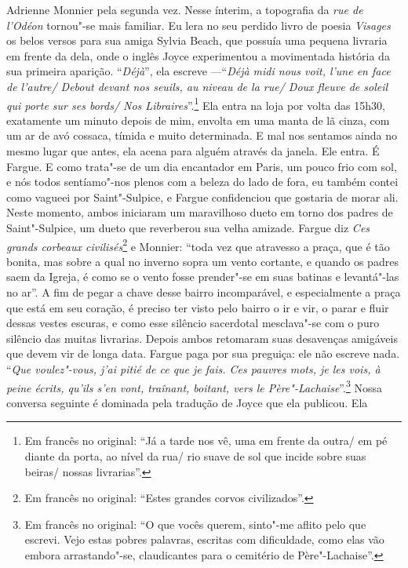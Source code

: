 Adrienne Monnier pela segunda vez. Nesse ínterim,
a topografia da \emph{rue de l'Odéon} tornou"-se mais familiar. Eu lera
no seu perdido livro de poesia \emph{Visages} os belos versos para sua
amiga Sylvia Beach, que possuía uma pequena livraria em frente da dela,
onde o inglês Joyce experimentou a movimentada história da sua primeira
aparição. ``\emph{Déjà}'', ela escreve ---``\emph{Déjà midi nous voit,
l'une en face de l'autre/ Debout devant nos seuils, au niveau de la rue/ Doux fleuve de soleil qui porte sur ses bords/ Nos
Libraires}''.\footnote{Em francês no original: ``Já a tarde nos vê, uma em frente da outra/
  em pé diante da porta, ao nível da rua/ rio suave de sol que incide
  sobre suas beiras/ nossas livrarias''. \versal{[N.~T.]}} Ela
entra na loja por volta das 15h30, exatamente um minuto depois de mim,
envolta em uma manta de lã cinza, com um ar de avó cossaca, tímida e
muito determinada. E mal nos sentamos ainda no mesmo lugar que antes,
ela acena para alguém através da janela. Ele entra. É Fargue. E como
trata"-se de um dia encantador em Paris, um pouco frio com sol, e nós
todos sentíamo"-nos plenos com a beleza do lado de fora, eu também
contei como vagueei por Saint"-Sulpice, e Fargue confidenciou que
gostaria de morar ali. Neste momento, ambos iniciaram um maravilhoso
dueto em torno dos padres de Saint"-Sulpice, um dueto que reverberou sua
velha amizade. Fargue diz \emph{Ces grands corbeaux civilisés}\footnote{Em francês no original:
  ``Estes grandes corvos civilizados''. \versal{[N.~T.]}} e
Monnier: ``toda vez que atravesso a praça, que é tão bonita, mas sobre a qual no inverno sopra um vento cortante, e quando os padres saem da Igreja, é como se o vento fosse prender"-se em suas batinas e levantá"-las no ar''.
A fim de pegar a chave desse bairro incomparável, e especialmente a praça que está em seu coração, é preciso ter visto pelo bairro o ir e vir, o parar e fluir dessas vestes escuras, e como esse silêncio sacerdotal mesclava"-se com o puro silêncio das muitas livrarias. Depois ambos retomaram suas desavenças amigáveis que
devem vir de longa data. Fargue paga por sua preguiça: ele não escreve
nada. ``\emph{Que voulez"-vous, j'ai pitié de ce que je fais. Ces pauvres
mots, je les vois, à peine écrits, qu'ils s'en vont, traînant, boitant,
vers le Père"-Lachaise}''.\footnote{Em francês no original: ``O que vocês querem, sinto"-me
  aflito pelo que escrevi. Vejo estas pobres palavras, escritas com
  dificuldade, como elas vão embora arrastando"-se, claudicantes para o
  cemitério de Père"-Lachaise''. \versal{[N.~T.]}} Nossa conversa
seguinte é dominada pela tradução de Joyce que ela publicou. Ela
